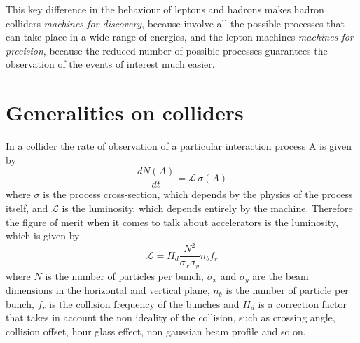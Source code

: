 This key difference in the behaviour of leptons and hadrons makes hadron colliders \textit{machines for discovery}, because involve all the possible processes that can take place in a wide range of energies, and the lepton machines \textit{machines for precision}, because the reduced number of possible processes guarantees the observation of the events of interest much easier.

\section{Generalities on colliders}

In a collider the rate of observation of  a particular interaction process A is given by
\[
\frac{dN(A)}{dt} = \mathscr{L} \, \sigma(A)
\]
where $\sigma$ is the process cross-section, which depends by the physics of the process itself, and $\mathscr{L}$ is the luminosity, which depends entirely by the machine.
Therefore the figure of merit when it comes to talk about accelerators is the luminosity, which is given by
\[
\mathscr{L} = H_d \frac{N^2}{\sigma_x \sigma_y} n_b f_r
\]
where $N$ is the number of particles per bunch, $\sigma_x$ and $\sigma_y$ are the beam dimensions in the horizontal and vertical plane, $n_b$ is the number of particle per bunch, $f_r$ is the collision frequency of the bunches and $H_d$ is a correction factor that takes in account the non ideality of the collision, such as crossing angle, collision offset, hour glass effect, non gaussian beam profile and so on.

